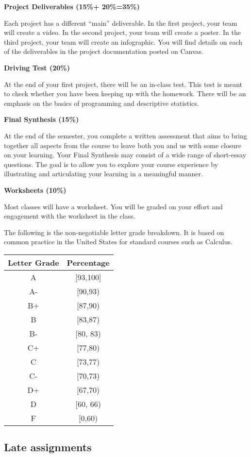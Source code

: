 \documentclass[
]{article}
\begin{document}
\textbf{Project Deliverables (15\%+ 20\%=35\%)}

Each project has a different ``main'' deliverable. In the first project, your team will create a video. In the second project, your team will create a poster. In the third project, your team will create an infographic. You will find details on each of the deliverables in the project documentation posted on Canvas.

\textbf{Driving Test (20\%)}

At the end of your first project, there will be an in-class test. This test is meant to check whether you have been keeping up with the homework. There will be an emphasis on the basics of programming and descriptive statistics.

\textbf{Final Synthesis (15\%)}

At the end of the semester, you complete a written assessment that aims to bring together all aspects from the course to leave both you and us with some closure on your learning. Your Final Synthesis may consist of a wide range of short-essay questions. The goal is to allow you to explore your course experience by illustrating and articulating your learning in a meaningful manner.

\textbf{Worksheets (10\%)}

Most classes will have a worksheet. You will be graded on your effort and engagement with the worksheet in the class.

The following is the non-negotiable letter grade breakdown. It is based on
common practice in the United States for standard courses such as Calculus.

\begin{longtable}[]{@{}cc@{}}
\toprule
\textbf{Letter Grade} & \textbf{Percentage}\tabularnewline
\midrule
\endhead
A & {[}93,100{]}\tabularnewline
A- & {[}90,93)\tabularnewline
B+ & {[}87,90)\tabularnewline
B & {[}83,87)\tabularnewline
B- & {[}80, 83)\tabularnewline
C+ & {[}77,80)\tabularnewline
C & {[}73,77)\tabularnewline
C- & {[}70,73)\tabularnewline
D+ & {[}67,70)\tabularnewline
D & {[}60, 66)\tabularnewline
F & {[}0,60)\tabularnewline
\bottomrule
\end{longtable}

\hypertarget{late-assignments}{%
\subsection*{Late assignments}\label{late-assignments}}
\end{document}
